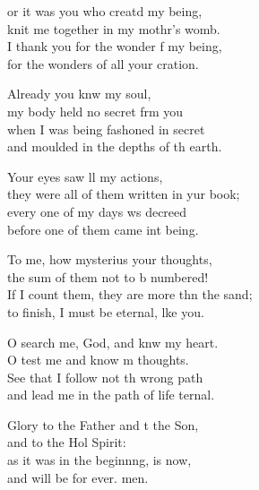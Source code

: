 \settowidth{\versewidth}{If I count them, they are more than the sand; *}
\begin{psalmverse}%
  \begin{patverse}
or it was you who creatd my being,\Med\\
knit me together in my mothr’s womb.\\
I thank you for the wonder f my being,\Med\\
for the wonders of all your cration.

Already you knw my soul,\Med\\
my body held no secret frm you\\
when I was being fash\pointup{\i}oned in secret\Med\\
and moulded in the depths of th earth.

Your eyes saw ll my actions,\Med\\
they were all of them written in yur book;\\
every one of my days ws decreed\Med\\
before one of them came int being.

To me, how mysterius your thoughts,\Med\\
the sum of them not to b numbered!\\
If I count them, they are more thn the sand;\Med\\
to finish, I must be eternal, l\pointup{\i}ke you.

O search me, God, and knw my heart.\Med\\
O test me and know m thoughts.\\
See that I follow not th wrong path\Med\\
and lead me in the path of life ternal.

Glory to the Father and t the Son,\Med\\
and to the Hol Spirit:\\
as it was in the beginn\pointup{\i}ng, is now,\Med\\
and will be for ever. men.
  \end{patverse}
\end{psalmverse}
